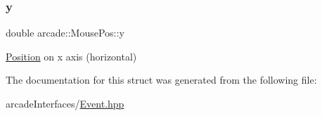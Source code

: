 \mbox{\label{structarcade_1_1_mouse_pos_a6737b813beae9a70aa6f7cbfc90154a6}} 
\subsubsection{\texorpdfstring{y}{y}}
{\footnotesize\ttfamily double arcade\+::\+Mouse\+Pos\+::y}



\hyperlink{structarcade_1_1_position}{Position} on x axis (horizontal) 



The documentation for this struct was generated from the following file\+:\begin{DoxyCompactItemize}
\item 
arcade\+Interfaces/\hyperlink{_event_8hpp}{Event.\+hpp}\end{DoxyCompactItemize}
